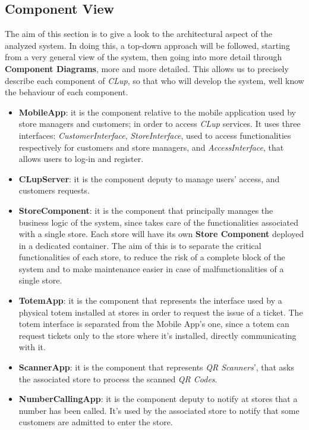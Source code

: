 \documentclass{article}
\begin{document}
	
	\subsection{Component View}
		The aim of this section is to give a look to the architectural aspect of the analyzed system. In doing this, a top-down approach will be followed, starting from a very general view of the system, then going into more detail through {\bfseries Component Diagrams}, more and more detailed. This allows us to precisely describe each component of \emph{CLup}, so that who will develop the system, well know the behaviour of each component.\\
		
		\begin{itemize}
			\item {\bfseries MobileApp}: it is the component relative to the mobile application used by store managers and customers; in order to access \emph{CLup} services. It uses three interfaces: \emph{CustomerInterface}, \emph{StoreInterface}, used to access functionalities respectively for customers and store managers, and \emph{AccessInterface}, that allows users to log-in and register.
			
			\item {\bfseries CLupServer}:  it is the component deputy to manage users’ access, and customers requests.
			
			\item {\bfseries StoreComponent}: it is the component that principally manages the business logic of the system, since takes care of the functionalities associated with a single store. Each store will have its own {\bfseries Store Component} deployed in a dedicated container. The aim of this is to separate the critical functionalities of each store, to reduce the risk of a complete block of the system and to make maintenance easier in case of malfunctionalities of a single store.
			
			\item {\bfseries TotemApp}: it is the component that represents the interface used by a physical totem installed at stores in order to request the issue of a ticket. The totem interface is separated from the Mobile App’s one, since a totem can request tickets only to the store where it’s installed, directly communicating with it.
			
			\item {\bfseries ScannerApp}: it is the component that represents \emph{QR Scanners}’, that asks the associated store to process the scanned \emph{QR Codes}.
			
			\item {\bfseries NumberCallingApp}: it is the component deputy to notify at stores that a number has been called. It’s used by the associated store to notify that some customers are admitted to enter the store.		
		\end{itemize}
	
\end{document}
